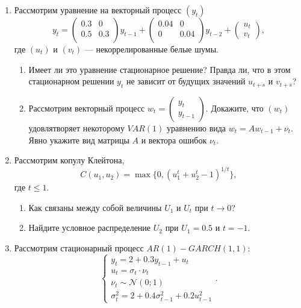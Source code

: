 \documentclass[12pt]{article}
\newcommand \cN{\mathcal{N}}
\begin{document}
\begin{enumerate}
\item Рассмотрим уравнение на векторный процесс $(y_t)$
\[
y_t   =
\begin{pmatrix}
    0.3 & 0 \\
    0.5 & 0.3 \\
\end{pmatrix}
y_{t-1}  +
\begin{pmatrix}
    0.04 & 0 \\
    0 & 0.04 \\
\end{pmatrix}
y_{t-2} +
\begin{pmatrix}
    u_t \\
    v_t
\end{pmatrix},
\]
где $(u_t)$ и $(v_t)$ — некоррелированные белые шумы. 
\begin{enumerate}
    \item Имеет ли это уравнение стационарное решение? Правда ли, что в этом стационарном решении $y_t$ не зависит от будущих значений $u_{t+s}$ и $v_{t+s}$?
    \item Рассмотрим векторный процесс
    $
        w_t = \begin{pmatrix}
            y_t \\
            y_{t-1}
        \end{pmatrix}.
    $
    Докажите, что $(w_t)$ удовлятворяет некоторому $VAR(1)$ уравнению вида 
    $
    w_t = A w_{t-1} + \nu_t.    
    $
    Явно укажите вид матрицы $A$ и вектора ошибок $\nu_t$.
\end{enumerate}

\item Рассмотрим копулу Клейтона, 
\[
C(u_1, u_2) = \max\{0, (u_1^t + u_2^t - 1)^{1/t} \},    
\]
где $t \leq 1$. 
\begin{enumerate}
    \item Как связаны между собой величины $U_1$ и $U_t$ при $t\to 0$?
    \item Найдите условное распределение $U_2$ при $U_1 = 0.5$ и $t = -1$.
\end{enumerate}

\item Рассмотрим стационарный процесс $AR(1)-GARCH(1,1)$:
\[
\begin{cases}
y_t = 2 + 0.3 y_{t-1} + u_t \\
u_t = \sigma_t \cdot \nu_t \\
\nu_t \sim \cN(0;1) \\
\sigma^2_t = 2 + 0.4 \sigma^2_{t-1} + 0.2u_{t-1}^2
\end{cases}.
\]


\end{enumerate}
\end{document}
